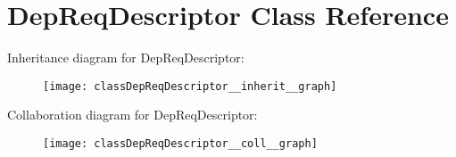 \hypertarget{classDepReqDescriptor}{}\section{Dep\+Req\+Descriptor Class Reference}
\label{classDepReqDescriptor}


Inheritance diagram for Dep\+Req\+Descriptor\+:\nopagebreak
\begin{figure}[H]
\begin{center}
\leavevmode
\texttt{[image: classDepReqDescriptor\_\_inherit\_\_graph]}
\end{center}
\end{figure}


Collaboration diagram for Dep\+Req\+Descriptor\+:\nopagebreak
\begin{figure}[H]
\begin{center}
\leavevmode
\texttt{[image: classDepReqDescriptor\_\_coll\_\_graph]}
\end{center}
\end{figure}
